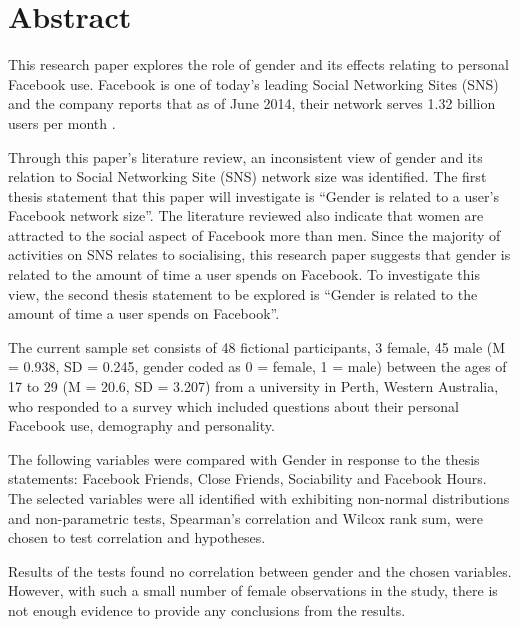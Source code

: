\section{Abstract}

This research paper explores the role of gender and its effects relating to personal Facebook use. Facebook is one of today's leading Social Networking Sites (SNS) and the company reports that as of June 2014, their network serves 1.32 billion users per month \citep{Facebook2014}.

Through this paper's literature review, an inconsistent view of gender and its relation to Social Networking Site (SNS) network size was identified. The first thesis statement that this paper will investigate is ``Gender is related to a user's Facebook network size''. The literature reviewed also indicate that women are attracted to the social aspect of Facebook more than men. Since the majority of activities on SNS relates to socialising, this research paper suggests that gender is related to the amount of time a user spends on Facebook. To investigate this view, the second thesis statement to be explored is ``Gender is related to the amount of time a user spends on Facebook''.

The current sample set consists of 48 fictional participants, 3 female, 45 male (M = 0.938, SD = 0.245, gender coded as 0 = female, 1 = male) between the ages of 17 to 29 (M = 20.6, SD = 3.207) from a university in Perth, Western Australia, who responded to a survey which included questions about their personal Facebook use, demography and personality.

The following variables were compared with Gender in response to the thesis statements: Facebook Friends, Close Friends, Sociability and Facebook Hours. The selected variables were all identified with exhibiting non-normal distributions and non-parametric tests, Spearman's correlation and Wilcox rank sum, were chosen to test correlation and hypotheses.

Results of the tests found no correlation between gender and the chosen variables. However, with such a small number of female observations in the study, there is not enough evidence to provide any conclusions from the results.